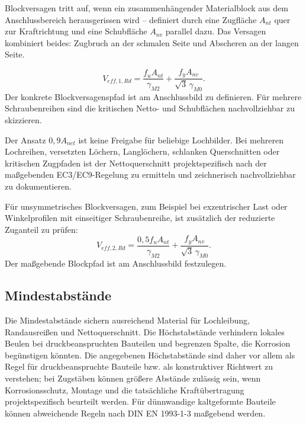 \documentclass[10pt,a4paper]{article}
\begin{document}
Blockversagen tritt auf, wenn ein zusammenhängender Materialblock aus dem Anschlussbereich herausgerissen wird -- definiert durch eine Zugfläche $A_{nt}$ quer zur Kraftrichtung und eine Schubfläche $A_{nv}$ parallel dazu. Das Versagen kombiniert beides: Zugbruch an der schmalen Seite und Abscheren an der langen Seite.

\begin{equation}
V_{eff,1,Rd} = \frac{f_u A_{nt}}{\gamma_{M2}}+\frac{f_y A_{nv}}{\sqrt{3}\,\gamma_{M0}}.
\end{equation}
Der konkrete Blockversagenspfad ist am Anschlussbild zu definieren. Für mehrere Schraubenreihen sind die kritischen Netto- und Schubflächen nachvollziehbar zu skizzieren.

\begin{hinweisbox}
Der Ansatz $0{,}9A_{net}$ ist keine Freigabe für beliebige Lochbilder. Bei mehreren Lochreihen, versetzten Löchern, Langlöchern, schlanken Querschnitten oder kritischen Zugpfaden ist der Nettoquerschnitt projektspezifisch nach der maßgebenden EC3/EC9-Regelung zu ermitteln und zeichnerisch nachvollziehbar zu dokumentieren.
\end{hinweisbox}

\begin{hinweisbox}
Für unsymmetrisches Blockversagen, zum Beispiel bei exzentrischer Last oder Winkelprofilen mit einseitiger Schraubenreihe, ist zusätzlich der reduzierte Zuganteil zu prüfen:
\[
V_{eff,2,Rd}=\frac{0{,}5 f_u A_{nt}}{\gamma_{M2}}+\frac{f_y A_{nv}}{\sqrt{3}\,\gamma_{M0}}.
\]
Der maßgebende Blockpfad ist am Anschlussbild festzulegen.
\end{hinweisbox}

\subsection{Mindestabstände}
Die Mindestabstände sichern ausreichend Material für Lochleibung, Randausreißen und Nettoquerschnitt. Die Höchstabstände verhindern lokales Beulen bei druckbeanspruchten Bauteilen und begrenzen Spalte, die Korrosion begünstigen könnten. Die angegebenen Höchstabstände sind daher vor allem als Regel für druckbeanspruchte Bauteile bzw. als konstruktiver Richtwert zu verstehen; bei Zugstäben können größere Abstände zulässig sein, wenn Korrosionsschutz, Montage und die tatsächliche Kraftübertragung projektspezifisch beurteilt werden. Für dünnwandige kaltgeformte Bauteile können abweichende Regeln nach DIN EN 1993-1-3 maßgebend werden.
\end{document}
